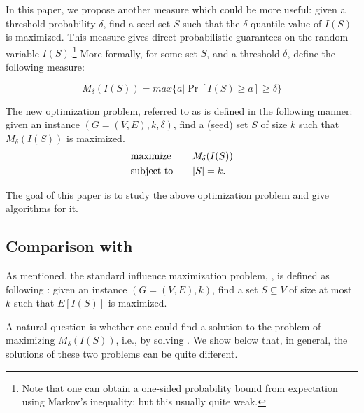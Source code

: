 In this paper, we propose another measure which could be more useful: given
a threshold  probability $\delta$, find a seed set $S$ such that the $\delta$-quantile value
of $I(S)$ is maximized. This measure
gives direct probabilistic
guarantees on the random variable $I(S)$.\footnote{Note that one can obtain a one-sided probability bound
from expectation using Markov's inequality; but this usually quite weak.} More formally,
for some
set $S$, and a threshold $\delta$, define the following measure:

\begin{equation} \label{eq:M_delta}
  M_{\delta}(I(S)) = max\{a | \Pr[I(S) \geq a] \geq \delta \}
\end{equation}

\medskip
The new optimization problem, referred to as \infprob{} is defined in the following manner: given
an instance $(G=(V, E), k, \delta)$, find a (seed) set $S$ of size $k$ such that $M_{\delta}(I(S))$ is
maximized.
\begin{equation}
\begin{alignedat}{2}
  & \text{maximize} & \qquad & M_{\delta}(I(S)) \\
  & \text{subject to} & & \lvert S\rvert = k.
\end{alignedat}
\end{equation}

The goal of this paper is to study the above optimization problem and give algorithms for it.


\vspace{-0.05in}
\subsection{Comparison with \infmax{}}

As mentioned, the standard influence maximization problem, \infmax{}, is defined as
following \cite{v011a004}: given an instance $(G=(V, E), k)$, find a set $S\subseteq V$ of
size at most $k$ such that $E[I(S)]$ is maximized.

A natural question is whether one could find a solution to the problem of maximizing
$M_{\delta}(I(S))$, i.e., \infprob{}  by  solving \infmax{}. We show below that,
in general, the solutions of these two problems can be quite different.


